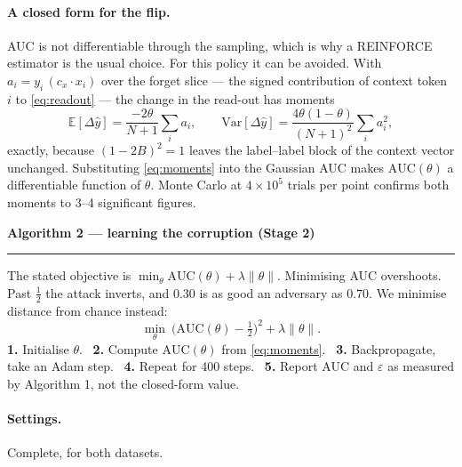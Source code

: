 \documentclass[11pt,a4paper]{article}
\newcommand{\algtitle}[1]{\textbf{#1}\par\vspace{3pt}\hrule\vspace{5pt}}
\begin{document}
\paragraph{A closed form for the flip.} AUC is not differentiable through the
sampling, which is why a REINFORCE estimator is the usual choice. For this
policy it can be avoided. With $a_i = y_i\,(c_x\!\cdot\! x_i)$ over the forget
slice --- the signed contribution of context token $i$ to
\eqref{eq:readout} --- the change in the read-out has moments
\begin{equation}
\mathbb E[\Delta\hat y] = \frac{-2\theta}{N+1}\sum_i a_i,
\qquad
\mathrm{Var}[\Delta\hat y] = \frac{4\theta(1-\theta)}{(N+1)^2}\sum_i a_i^2 ,
\label{eq:moments}
\end{equation}
exactly, because $(1-2B)^2=1$ leaves the label--label block of the context
vector unchanged. Substituting \eqref{eq:moments} into the Gaussian AUC makes
$\mathrm{AUC}(\theta)$ a differentiable function of $\theta$. Monte Carlo at
$4\times10^5$ trials per point confirms both moments to 3--4 significant
figures.

\begin{algbox}
\algtitle{Algorithm 2 — learning the corruption (Stage 2)}
\small
The stated objective is $\min_\theta \mathrm{AUC}(\theta)+\lambda\|\theta\|$.
Minimising AUC overshoots. Past $\tfrac12$ the attack inverts, and $0.30$ is as
good an adversary as $0.70$. We minimise distance from chance instead:
\begin{equation*}
\min_\theta\ \big(\mathrm{AUC}(\theta)-\tfrac12\big)^2 + \lambda\|\theta\| .
\end{equation*}
\textbf{1.} Initialise $\theta$. \ \textbf{2.} Compute $\mathrm{AUC}(\theta)$
from \eqref{eq:moments}. \ \textbf{3.} Backpropagate, take an Adam step.
\ \textbf{4.} Repeat for 400 steps. \ \textbf{5.} Report AUC and $\varepsilon$
as measured by Algorithm 1, not the closed-form value.
\end{algbox}

\paragraph{Settings.} Complete, for both datasets.
\end{document}
